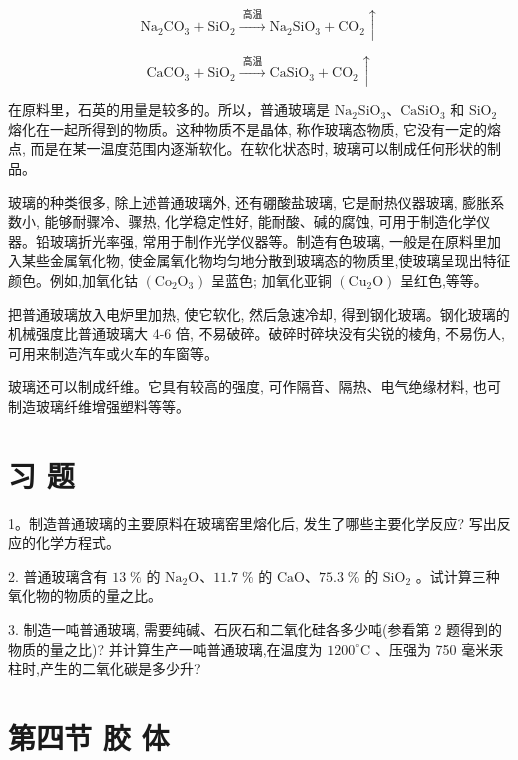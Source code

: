 \documentclass[10pt]{article}
\begin{document}
\[
{\mathrm{{Na}}}_{2}{\mathrm{{CO}}}_{3} + {\mathrm{{SiO}}}_{2}\xrightarrow[]{\text{ 高温 }}{\mathrm{{Na}}}_{2}{\mathrm{{SiO}}}_{3} + {\mathrm{{CO}}}_{2} \uparrow
\]

\[
{\mathrm{{CaCO}}}_{3} + {\mathrm{{SiO}}}_{2}\xrightarrow[]{\text{ 高温 }}{\mathrm{{CaSiO}}}_{3} + {\mathrm{{CO}}}_{2} \uparrow
\]

在原料里，石英的用量是较多的。所以，普通玻璃是 \({\mathrm{{Na}}}_{2}{\mathrm{{SiO}}}_{3}\text{、}{\mathrm{{CaSiO}}}_{3}\) 和 \({\mathrm{{SiO}}}_{2}\) 熔化在一起所得到的物质。这种物质不是晶体, 称作玻璃态物质, 它没有一定的熔点, 而是在某一温度范围内逐渐软化。在软化状态时, 玻璃可以制成任何形状的制品。

玻璃的种类很多, 除上述普通玻璃外, 还有硼酸盐玻璃, 它是耐热仪器玻璃, 膨胀系数小, 能够耐骤冷、骤热, 化学稳定性好, 能耐酸、碱的腐蚀, 可用于制造化学仪器。铅玻璃折光率强, 常用于制作光学仪器等。制造有色玻璃, 一般是在原料里加入某些金属氧化物, 使金属氧化物均匀地分散到玻璃态的物质里,使玻璃呈现出特征颜色。例如,加氧化钴 \(\left( {{\mathrm{{Co}}}_{2}{\mathrm{O}}_{3}}\right)\) 呈蓝色; 加氧化亚铜 \(\left( {{\mathrm{{Cu}}}_{2}\mathrm{O}}\right)\) 呈红色,等等。

把普通玻璃放入电炉里加热, 使它软化, 然后急速冷却, 得到钢化玻璃。钢化玻璃的机械强度比普通玻璃大 4-6 倍, 不易破碎。破碎时碎块没有尖锐的棱角, 不易伤人, 可用来制造汽车或火车的车窗等。

玻璃还可以制成纤维。它具有较高的强度, 可作隔音、隔热、电气绝缘材料, 也可制造玻璃纤维增强塑料等等。

\section*{习 题}

1。制造普通玻璃的主要原料在玻璃窑里熔化后, 发生了哪些主要化学反应? 写出反应的化学方程式。

2. 普通玻璃含有 \({13}\;\%\) 的 \({\mathrm{{Na}}}_{2}\mathrm{O}\text{、}{11.7}\;\%\) 的 \(\mathrm{{CaO}}\text{、}{75.3}\;\%\) 的 \({\mathrm{{SiO}}}_{2}\) 。试计算三种氧化物的物质的量之比。

3. 制造一吨普通玻璃, 需要纯碱、石灰石和二氧化硅各多少吨(参看第 2 题得到的物质的量之比)? 并计算生产一吨普通玻璃,在温度为 \({1200}^{ \circ }\mathrm{C}\) 、压强为 750 毫米汞柱时,产生的二氧化碳是多少升?

\section*{第四节 胶 体}
\end{document}

